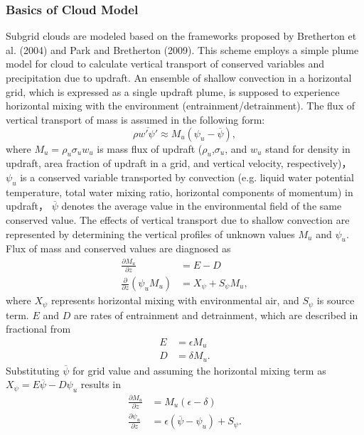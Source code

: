 \subsubsection{Basics of Cloud Model}\label{basics-of-cloud-model}
Subgrid clouds are modeled based on the frameworks proposed by Bretherton et al. (2004) and Park and Bretherton (2009).
This scheme employs a simple plume model for cloud to calculate vertical transport of conserved variables and precipitation due to updraft.
An ensemble of shallow convection in a horizontal grid, which is expressed as a single updraft plume, is supposed to experience horizontal mixing with the environment
(entrainment/detrainment). The flux of vertical transport of mass is assumed in the following form:
\begin{equation}\label{def_Mu}
    \rho \overline {w' \psi '}\approx M_u (\psi_u-\overline{\psi}) ,
\end{equation}
where $M_u=\rho_u\sigma_u w_u$ is mass flux of updraft ($\rho_u$,$\sigma_u$, and $w_u$ stand for density in updraft, area fraction of updraft in a grid, and vertical velocity, respectively)，
$\psi_u$ is a conserved variable transported by convection (e.g. liquid water potential temperature, total water mixing ratio, horizontal components of momentum) in updraft，
$\overline{\psi}$ denotes the average value in the environmental field of the same conserved value.
The effects of vertical transport due to shallow convection are represented by determining the vertical profiles of unknown values $M_u$ and $\psi_u$.
Flux of mass and conserved values are diagnosed as
\begin{align}
    \frac{\partial M_u}{\partial z} &= E - D \label{zprof_Mu}\\
    \frac{\partial}{\partial z} (\psi_u M_u) &= X_\psi + S_\psi M_u,\label{zprof_psi}
\end{align}
where $X_\psi$ represents horizontal mixing with environmental air, and $S_\psi$ is source term. $E$ and $D$ are rates of entrainment and detrainment, which are described in fractional from
\begin{align}
    E &=\epsilon M_u \label{fracE}\\
    D &=\delta M_u. \label{fracD}
\end{align}
Substituting $\overline{\psi}$ for grid value and assuming the horizontal mixing term as $X_{\psi}=E \overline{\psi} - D\psi_u$ results in
\begin{align}
    \frac{\partial M_u}{\partial z} &= M_u (\epsilon - \delta) \label{zprof_Mu'}\\
    \frac{\partial \psi_u}{\partial z} &= \epsilon(\overline{\psi} - \psi_u) + S_{\psi}. \label{zprof_psi'}
\end{align}
